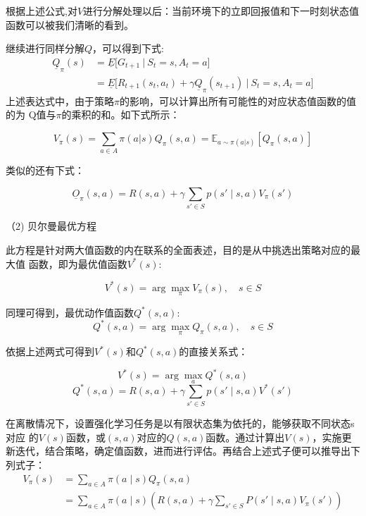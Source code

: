 根据上述公式,对${V}$进行分解处理以后：当前环境下的立即回报值和下一时刻状态值函数可以被我们清晰的看到。

继续进行同样分解${Q}$，可以得到下式:
\begin{align}
	\underline{Q}_\pi(s) &= \underline{E} \Big[ G_{t+1} \ \Big| \ S_t = s, A_t = a \Big] \label{eq:bellman1} \\
	&= \underline{E} \Big[ R_{t+1}(s_t, a_t) + \gamma \underline{Q}_\pi(s_{t+1}) \ \Big| \ S_t = s, A_t = a \Big] \label{eq:bellman2}
\end{align}
上述表达式中，由于策略$\pi$的影响，可以计算出所有可能性的对应状态值函数的值的为
Q值与$\pi$的乘积的和。如下式所示：

\begin{equation}
V_{\pi}(s) = \sum_{a \in A} \pi(a|s) Q_{\pi}(s,a) = \mathbb{E}_{a \sim \pi(a|s)} \left[ Q_{\pi}(s,a) \right]
\end{equation}

类似的还有下式：

\begin{equation}
\underline{O}_{\pi}(s, a) = R(s, a) + \gamma \sum_{s' \in S} p(s' \mid s, a) V_{\pi}(s')
\end{equation}

（2) 贝尔曼最优方程

此方程是针对两大值函数的内在联系的全面表述，目的是从中挑选出策略对应的最大值
函数，即为最优值函数$V^*(s)$:

\begin{equation}
V^*(s) = \arg\max_{\pi} V_{\pi}(s), \quad s \in S
\end{equation}

同理可得到，最优动作值函数$Q^*(s,a)$:
\begin{equation}
Q^*(s, a) = \arg\max_{\pi} Q_{\pi}(s, a), \quad s \in S
\end{equation}

依据上述两式可得到$V^*(s)$和$Q^*(s,a)$的直接关系式：

\begin{equation}
V^*(s) = \arg\max_{a} Q^*(s, a)
\end{equation}
\begin{equation}
Q^*(s, a) = R(s, a) + \gamma \sum_{s' \in S} p(s' \mid s, a) V^*(s')
\end{equation}

在离散情况下，设置强化学习任务是以有限状态集为依托的，能够获取不同状态s对应
的$V(s)$函数，或$(s,a)$对应的$Q(s,a)$函数。通过计算出$V(s)$，实施更新迭代，结合策略，确定值函数，进而进行评估。再结合上述式子便可以推导出下列式子：
\begin{align}
	V_{\pi}(s) &= \sum_{a \in A} \pi(a \mid s) Q_{\pi}(s, a) \label{eq:value1} \\
	&= \sum_{a \in A} \pi(a \mid s) \left( R(s, a) + \gamma \sum_{s' \in S} P(s' \mid s, a) V_{\pi}(s') \right) \label{eq:value2}
\end{align}

